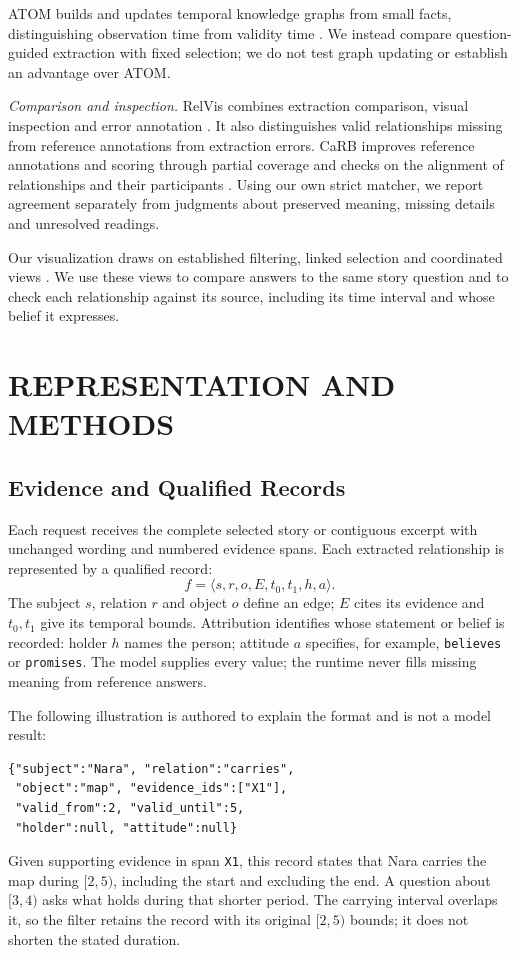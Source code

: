 \documentclass[a4paper,twoside]{article}
\begin{document}
ATOM builds and updates temporal knowledge graphs from small facts, distinguishing observation time from validity time \cite{lairgi2026}. We instead compare question-guided extraction with fixed selection; we do not test graph updating or establish an advantage over ATOM.

\emph{Comparison and inspection.} RelVis combines extraction comparison, visual inspection and error annotation \cite{schneider2017}. It also distinguishes valid relationships missing from reference annotations from extraction errors. CaRB improves reference annotations and scoring through partial coverage and checks on the alignment of relationships and their participants \cite{bhardwaj2019}. Using our own strict matcher, we report agreement separately from judgments about preserved meaning, missing details and unresolved readings.

Our visualization draws on established filtering, linked selection and coordinated views \cite{heer2012}. We use these views to compare answers to the same story question and to check each relationship against its source, including its time interval and whose belief it expresses.



\section{\uppercase{Representation and Methods}}


\subsection{Evidence and Qualified Records}
\noindent Each request receives the complete selected story or contiguous excerpt with unchanged wording and numbered evidence spans. Each extracted relationship is represented by a qualified record:
\begin{equation}
\label{eq:qualified-record}
f = \langle s, r, o, E, t_0, t_1, h, a \rangle .
\end{equation}
The subject $s$, relation $r$ and object $o$ define an edge; $E$ cites its evidence and $t_0,t_1$ give its temporal bounds. Attribution identifies whose statement or belief is recorded: holder $h$ names the person; attitude $a$ specifies, for example, \texttt{believes} or \texttt{promises}. The model supplies every value; the runtime never fills missing meaning from reference answers.

The following illustration is authored to explain the format and is not a model result:
\begin{small}\begin{verbatim}
{"subject":"Nara", "relation":"carries",
 "object":"map", "evidence_ids":["X1"],
 "valid_from":2, "valid_until":5,
 "holder":null, "attitude":null}
\end{verbatim}\end{small}
Given supporting evidence in span \texttt{X1}, this record states that Nara carries the map during $[2,5)$, including the start and excluding the end. A question about $[3,4)$ asks what holds during that shorter period. The carrying interval overlaps it, so the filter retains the record with its original $[2,5)$ bounds; it does not shorten the stated duration.
\end{document}
